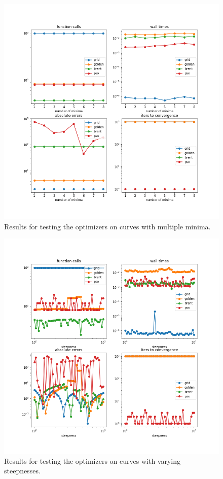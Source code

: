 \documentclass[letterpaper,12pt,twocolumn]{article}
\begin{document}
\begin{figure}
    \centering
    \includegraphics[width=\textwidth]{../figures/multmins-res.png}
    \caption{Results for testing the optimizers on curves with multiple minima.}
    \label{fig:multmins-res}
\end{figure}

\begin{figure}
    \centering
    \includegraphics[width=\textwidth]{../figures/steepness-res.png}
    \caption{Results for testing the optimizers on curves with varying steepnesses.}
    \label{fig:steep-res}
\end{figure}
\end{document}
